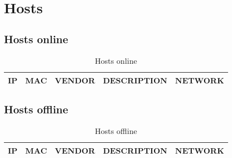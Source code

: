 \documentclass[a4paper]{article}
\begin{document}
\section{Hosts}



\subsection{Hosts online}


\begin{table}[!hbt]
	\centering
	\begin{tabular}{|c|c|c|c|c|}
		\hline
		\textbf{IP} & \textbf{MAC} & \textbf{VENDOR} & \textbf{DESCRIPTION} & \textbf{NETWORK} \\ \hline


	\end{tabular}
	\caption{Hosts online}
	\label{tab:my-table}
\end{table}



\subsection{Hosts offline}

\begin{table}[!hbt]
	\centering
	\begin{tabular}{|c|c|c|c|c|}
		\hline
		\textbf{IP} & \textbf{MAC} & \textbf{VENDOR} & \textbf{DESCRIPTION} & \textbf{NETWORK} \\ \hline


	\end{tabular}
	\caption{Hosts offline}
	\label{tab:my-table2}
\end{table}
\end{document}
